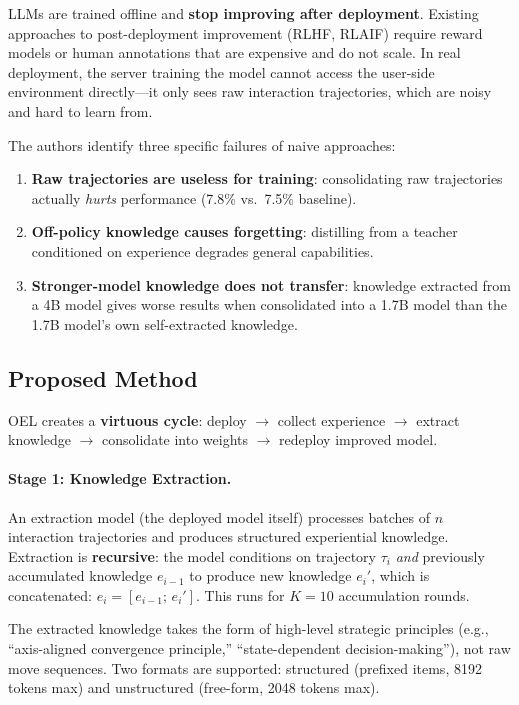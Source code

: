 \documentclass[11pt]{article}
\begin{document}
LLMs are trained offline and \textbf{stop improving after deployment}.
Existing approaches to post-deployment improvement (RLHF, RLAIF) require reward models or human annotations that are expensive and do not scale.
In real deployment, the server training the model cannot access the user-side environment directly---it only sees raw interaction trajectories, which are noisy and hard to learn from.

The authors identify three specific failures of naive approaches:
\begin{enumerate}
    \item \textbf{Raw trajectories are useless for training}: consolidating raw trajectories actually \emph{hurts} performance (7.8\% vs.\ 7.5\% baseline).
    \item \textbf{Off-policy knowledge causes forgetting}: distilling from a teacher conditioned on experience degrades general capabilities.
    \item \textbf{Stronger-model knowledge does not transfer}: knowledge extracted from a 4B model gives worse results when consolidated into a 1.7B model than the 1.7B model's own self-extracted knowledge.
\end{enumerate}

\subsection{Proposed Method}

OEL creates a \textbf{virtuous cycle}: deploy $\rightarrow$ collect experience $\rightarrow$ extract knowledge $\rightarrow$ consolidate into weights $\rightarrow$ redeploy improved model.

\paragraph{Stage 1: Knowledge Extraction.}
An extraction model (the deployed model itself) processes batches of $n$ interaction trajectories and produces structured experiential knowledge.
Extraction is \textbf{recursive}: the model conditions on trajectory $\tau_i$ \emph{and} previously accumulated knowledge $e_{i-1}$ to produce new knowledge $e_i'$, which is concatenated: $e_i = [e_{i-1};\, e_i']$.
This runs for $K\!=\!10$ accumulation rounds.

The extracted knowledge takes the form of high-level strategic principles (e.g., ``axis-aligned convergence principle,'' ``state-dependent decision-making''), not raw move sequences.
Two formats are supported: structured (prefixed items, 8192 tokens max) and unstructured (free-form, 2048 tokens max).
\end{document}
